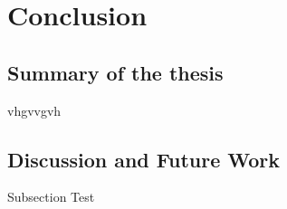 \chapter{Conclusion}
\section{Summary of the thesis}
vhgvvgvh
\section{Discussion and Future Work}
Subsection Test
